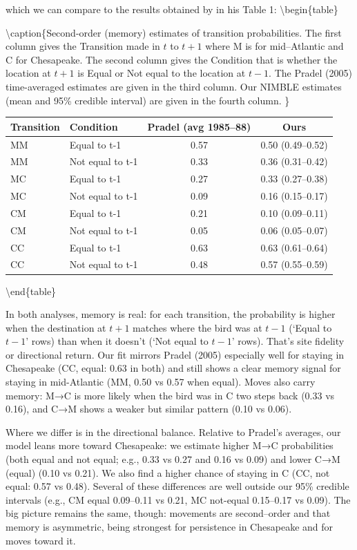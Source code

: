\documentclass[
  12pt,
]{krantz}
\begin{document}
which we can compare to the results obtained by \citet{pradel_multievent_2005} in his Table 1:
\textbackslash begin\{table\}

\textbackslash caption\{\label{tab:unnamed-chunk-403}Second-order (memory) estimates of transition probabilities. The first column gives the Transition made in \(t\) to \(t+1\) where M is for mid--Atlantic and C for Chesapeake. The second column gives the Condition that is whether the location at \(t+1\) is Equal or Not equal to the location at \(t-1\). The Pradel (2005) time-averaged estimates are given in the third column. Our NIMBLE estimates (mean and 95\% credible interval) are given in the fourth column. \}
\centering

\begin{tabular}[t]{l|l|c|c}
\hline
Transition & Condition & Pradel (avg 1985–88) & Ours\\
\hline
MM & Equal to t-1 & 0.57 & 0.50 (0.49–0.52)\\
\hline
MM & Not equal to t-1 & 0.33 & 0.36 (0.31–0.42)\\
\hline
MC & Equal to t-1 & 0.27 & 0.33 (0.27–0.38)\\
\hline
MC & Not equal to t-1 & 0.09 & 0.16 (0.15–0.17)\\
\hline
CM & Equal to t-1 & 0.21 & 0.10 (0.09–0.11)\\
\hline
CM & Not equal to t-1 & 0.05 & 0.06 (0.05–0.07)\\
\hline
CC & Equal to t-1 & 0.63 & 0.63 (0.61–0.64)\\
\hline
CC & Not equal to t-1 & 0.48 & 0.57 (0.55–0.59)\\
\hline
\end{tabular}

\textbackslash end\{table\}

In both analyses, memory is real: for each transition, the probability is higher when the destination at \(t+1\) matches where the bird was at \(t−1\) (`Equal to \(t-1\)' rows) than when it doesn't (`Not equal to \(t-1\)' rows). That's site fidelity or directional return. Our fit mirrors Pradel (2005) especially well for staying in Chesapeake (CC, equal: 0.63 in both) and still shows a clear memory signal for staying in mid-Atlantic (MM, 0.50 vs 0.57 when equal). Moves also carry memory: M→C is more likely when the bird was in C two steps back (0.33 vs 0.16), and C→M shows a weaker but similar pattern (0.10 vs 0.06).

Where we differ is in the directional balance. Relative to Pradel's averages, our model leans more toward Chesapeake: we estimate higher M→C probabilities (both equal and not equal; e.g., 0.33 vs 0.27 and 0.16 vs 0.09) and lower C→M (equal) (0.10 vs 0.21). We also find a higher chance of staying in C (CC, not equal: 0.57 vs 0.48). Several of these differences are well outside our 95\% credible intervals (e.g., CM equal 0.09--0.11 vs 0.21, MC not-equal 0.15--0.17 vs 0.09). The big picture remains the same, though: movements are second--order and that memory is asymmetric, being strongest for persistence in Chesapeake and for moves toward it.
\end{document}
